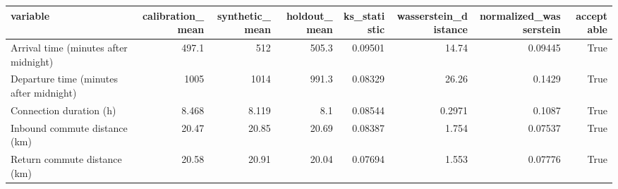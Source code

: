 \begin{tabular}{lrrrrrrr}
\toprule
variable & calibration\_mean & synthetic\_mean & holdout\_mean & ks\_statistic & wasserstein\_distance & normalized\_wasserstein & acceptable \\
\midrule
Arrival time (minutes after midnight) & 497.1 & 512 & 505.3 & 0.09501 & 14.74 & 0.09445 & True \\
Departure time (minutes after midnight) & 1005 & 1014 & 991.3 & 0.08329 & 26.26 & 0.1429 & True \\
Connection duration (h) & 8.468 & 8.119 & 8.1 & 0.08544 & 0.2971 & 0.1087 & True \\
Inbound commute distance (km) & 20.47 & 20.85 & 20.69 & 0.08387 & 1.754 & 0.07537 & True \\
Return commute distance (km) & 20.58 & 20.91 & 20.04 & 0.07694 & 1.553 & 0.07776 & True \\
\bottomrule
\end{tabular}
